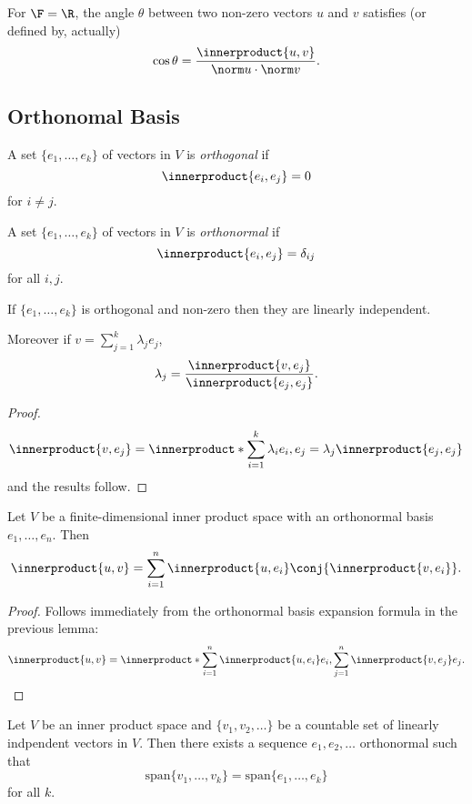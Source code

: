 \documentclass[a4paper]{article}
\newcommand*{\ip}{\innerproduct}
\theoremstyle{definition}
\begin{document}
\begin{remark}
  For \(\F = \R\), the angle \(\theta\) between two non-zero vectors \(u\) and \(v\) satisfies (or defined by, actually)
  \[
    \cos \theta = \frac{\ip{u, v}}{\norm u \cdot \norm v}.
  \]
\end{remark}

\subsection{Orthonomal Basis}

\begin{definition}[Orthogonality]
  A set \(\{e_1, \dots, e_k\}\) of vectors in \(V\) is \emph{orthogonal} if
  \[
    \ip{e_i, e_j} = 0
  \]
  for \(i \neq j\).
\end{definition}

\begin{definition}[Orthonormality]
  A set \(\{e_1, \dots, e_k\}\) of vectors in \(V\) is \emph{orthonormal} if
  \[
    \ip{e_i, e_j} = \delta_{ij}
  \]
  for all \(i, j\).
\end{definition}

\begin{lemma}
  If \(\{e_1, \dots, e_k\}\) is orthogonal and non-zero then they are linearly independent.

  Moreover if \(v = \sum_{j = 1}^k \lambda_j e_j\),
  \[
    \lambda_j = \frac{\ip{v, e_j}}{\ip{e_j, e_j}}.
  \]
\end{lemma}

\begin{proof}
  \[
    \ip{v, e_j} = \ip*{\sum_{i = 1}^{k} \lambda_ie_i, e_j} = \lambda_j \ip{e_j, e_j}
  \]
  and the results follow.
\end{proof}

\begin{lemma}
  Let \(V\) be a finite-dimensional inner product space with an orthonormal basis \(e_1, \dots, e_n\). Then
  \[
    \ip{u, v} = \sum_{i = 1}^{n}\ip{u, e_i} \conj{\ip{v, e_i}}.
  \]
\end{lemma}

\begin{proof}
  Follows immediately from the orthonormal basis expansion formula in the previous lemma:
  \[
    \ip{u, v} = \ip*{\sum_{i = 1}^n \ip{u, e_i}e_i, \sum_{j = 1}^n \ip{v,e_j}e_j}.
  \]
\end{proof}

\begin{theorem}
  Let \(V\) be an inner product space and \(\{v_1, v_2, \dots \}\) be a countable set of linearly indpendent vectors in \(V\). Then there exists a sequence \(e_1, e_2, \dots\) orthonormal such that
  \[
    \text{span} \{v_1, \dots, v_k\} = \text{span} \{e_1, \dots, e_k\}
  \]
  for all \(k\).
\end{theorem}
\end{document}
